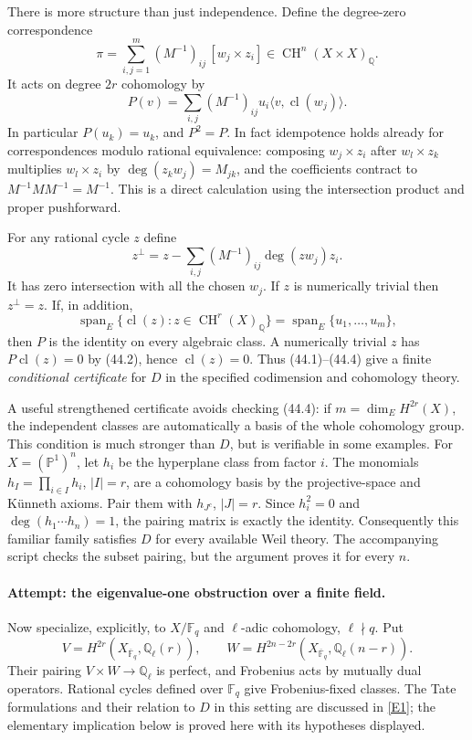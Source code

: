 \documentclass[11pt,a4paper]{article}
\newcommand{\Q}{\mathbb{Q}}
\newcommand{\F}{\mathbb{F}}
\newcommand{\PP}{\mathbb P}
\newcommand{\eref}[2]{\hyperlink{extra:#1:#2}{[E#2]}}
\numberwithin{equation}{section}
\begin{document}
There is more structure than just independence. Define the degree-zero
correspondence
\[
 \pi=\sum_{i,j=1}^m(M^{-1})_{ij}\,[w_j\times z_i]
          \in\operatorname{CH}^{n}(X\times X)_{\Q}. \tag{44.1}
\]
It acts on degree $2r$ cohomology by
\[
 P(v)=\sum_{i,j}(M^{-1})_{ij}u_i\langle v,\operatorname{cl}(w_j)\rangle.
 \tag{44.2}
\]
In particular $P(u_k)=u_k$, and $P^2=P$. In fact idempotence holds
already for correspondences modulo rational equivalence: composing
$w_j\times z_i$ after $w_l\times z_k$ multiplies $w_l\times z_i$
by $\deg(z_kw_j)=M_{jk}$, and the coefficients contract to
$M^{-1}MM^{-1}=M^{-1}$. This is a direct calculation using the
intersection product and proper pushforward.

For any rational cycle $z$ define
\[
 z^\perp=z-\sum_{i,j}(M^{-1})_{ij}\deg(zw_j)z_i.
 \tag{44.3}
\]
It has zero intersection with all the chosen $w_j$. If $z$ is numerically
trivial then $z^\perp=z$. If, in addition,
\[
 \operatorname{span}_E\{\operatorname{cl}(z):z\in
          \operatorname{CH}^r(X)_{\Q}\}
       =\operatorname{span}_E\{u_1,\ldots,u_m\}, \tag{44.4}
\]
then $P$ is the identity on every algebraic class. A numerically trivial
$z$ has $P\operatorname{cl}(z)=0$ by (44.2), hence
$\operatorname{cl}(z)=0$. Thus (44.1)--(44.4) give a finite
\emph{conditional certificate} for $D$ in the specified codimension
and cohomology theory.

A useful strengthened certificate avoids checking (44.4): if
$m=\dim_E H^{2r}(X)$, the independent classes are automatically a basis
of the whole cohomology group. This condition is much stronger than $D$,
but is verifiable in some examples. For $X=(\PP^1)^n$, let $h_i$ be the
hyperplane class from factor $i$. The monomials $h_I=\prod_{i\in I}h_i$,
$|I|=r$, are a cohomology basis by the projective-space and K\"unneth
axioms. Pair them with $h_{J^c}$, $|J|=r$. Since $h_i^2=0$ and
$\deg(h_1\cdots h_n)=1$, the pairing matrix is exactly the identity.
Consequently this familiar family satisfies $D$ for every available
Weil theory. The accompanying script checks the subset pairing, but the
argument proves it for every $n$.

\paragraph{Attempt: the eigenvalue-one obstruction over a finite field.}
Now specialize, explicitly, to $X/\F_q$ and $\ell$-adic cohomology,
$\ell\nmid q$. Put
\[
 V=H^{2r}(X_{\overline{\F}_q},\Q_\ell(r)),\qquad
 W=H^{2n-2r}(X_{\overline{\F}_q},\Q_\ell(n-r)).
\]
Their pairing $V\times W\to\Q_\ell$ is perfect, and Frobenius acts by
mutually dual operators. Rational cycles defined over $\F_q$ give
Frobenius-fixed classes. The Tate formulations and their relation to
$D$ in this setting are discussed in \eref{statement}{1}; the elementary
implication below is proved here with its hypotheses displayed.
\end{document}
